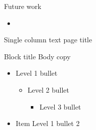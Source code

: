 \documentclass[t]{beamer}
\begin{document}
\begin{frame}{Future work}

  		\begin{itemize}    
  			\item 
		\end{itemize}
  	
\end{frame}


\begin{frame}{Single column text page title}
	\begin{block}{Block title}
  		Body copy
  		\begin{itemize}    
  			\item Level 1 bullet
			\begin{itemize}
					\item Level 2 bullet
					\begin{itemize}
						\item Level 3 bullet
					\end{itemize}
			\end{itemize}
  			\item Item Level 1 bullet 2
  		\end{itemize}    
	\end{block}
\end{frame}
\end{document}
